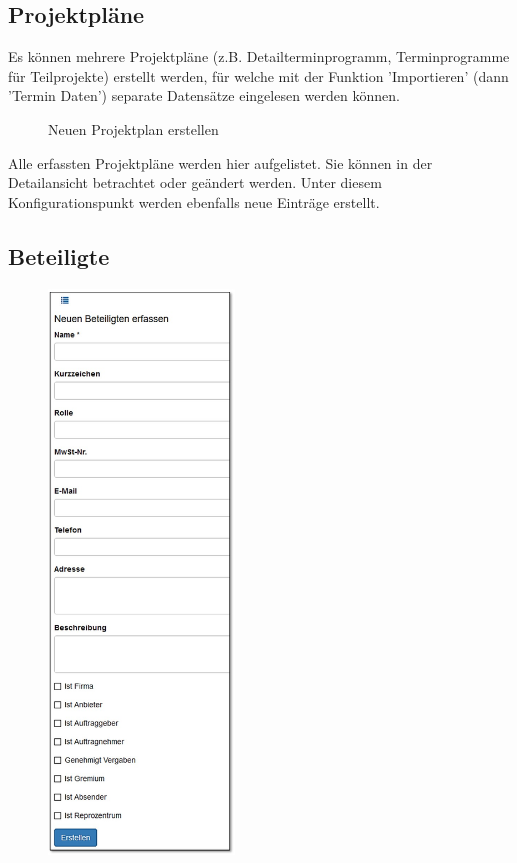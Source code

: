 \subsection{Projektpläne}

Es können mehrere Projektpläne (z.B. Detailterminprogramm, Terminprogramme für Teilprojekte) erstellt werden, für welche mit der Funktion 'Importieren' (dann  'Termin Daten') separate Datensätze eingelesen werden können.

\begin{figure}[H]
\caption{Neuen Projektplan erstellen}
\end{figure}

Alle erfassten Projektpläne werden hier aufgelistet. Sie können in der Detailansicht betrachtet oder geändert werden. Unter diesem Konfigurationspunkt werden ebenfalls neue Einträge erstellt.

\subsection{Beteiligte}
\label{bkm:Ref2018071602}

\begin{figure}
\vspace{-45pt}
\includegraphics[height=150mm]{../chapters/13_Konfigurationen/pictures/konf_BeteiligteErfassen.jpg}
\end{figure}

